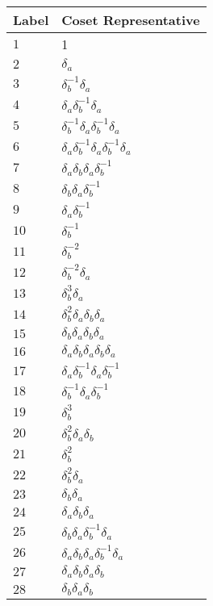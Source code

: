\documentclass{article}
\begin{document}

\begin{center}
\begin{tabular}{ll}
\toprule
Label & Coset Representative\\
\midrule
$1$ & 1 \\
$2$ & $\delta_a^{}$ \\
$3$ & $\delta_b^{-1}\delta_a^{}$ \\
$4$ & $\delta_a^{}\delta_b^{-1}\delta_a^{}$ \\
$5$ & $\delta_b^{-1}\delta_a^{}\delta_b^{-1}\delta_a^{}$ \\
$6$ & $\delta_a^{}\delta_b^{-1}\delta_a^{}\delta_b^{-1}\delta_a^{}$ \\
$7$ & $\delta_a^{}\delta_b^{}\delta_a^{}\delta_b^{-1}$ \\
$8$ & $\delta_b^{}\delta_a^{}\delta_b^{-1}$ \\
$9$ & $\delta_a^{}\delta_b^{-1}$ \\
$10$ & $\delta_b^{-1}$ \\
$11$ & $\delta_b^{-2}$ \\
$12$ & $\delta_b^{-2}\delta_a^{}$ \\
$13$ & $\delta_b^{3}\delta_a^{}$ \\
$14$ & $\delta_b^{2}\delta_a^{}\delta_b^{}\delta_a^{}$ \\
$15$ & $\delta_b^{}\delta_a^{}\delta_b^{}\delta_a^{}$ \\
$16$ & $\delta_a^{}\delta_b^{}\delta_a^{}\delta_b^{}\delta_a^{}$ \\
$17$ & $\delta_a^{}\delta_b^{-1}\delta_a^{}\delta_b^{-1}$ \\
$18$ & $\delta_b^{-1}\delta_a^{}\delta_b^{-1}$ \\
$19$ & $\delta_b^{3}$ \\
$20$ & $\delta_b^{2}\delta_a^{}\delta_b^{}$ \\
$21$ & $\delta_b^{2}$ \\
$22$ & $\delta_b^{2}\delta_a^{}$ \\
$23$ & $\delta_b^{}\delta_a^{}$ \\
$24$ & $\delta_a^{}\delta_b^{}\delta_a^{}$ \\
$25$ & $\delta_b^{}\delta_a^{}\delta_b^{-1}\delta_a^{}$ \\
$26$ & $\delta_a^{}\delta_b^{}\delta_a^{}\delta_b^{-1}\delta_a^{}$ \\
$27$ & $\delta_a^{}\delta_b^{}\delta_a^{}\delta_b^{}$ \\
$28$ & $\delta_b^{}\delta_a^{}\delta_b^{}$ \\

\end{tabular}
\end{center}
\end{document}
